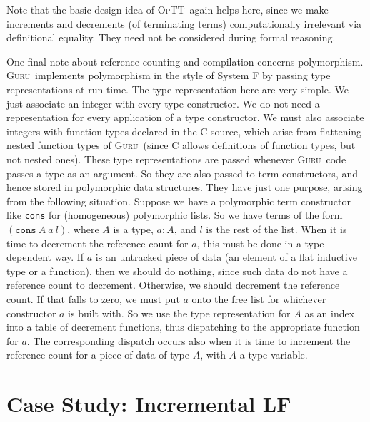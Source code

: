 \documentclass[9pt,natbib]{sigplanconf}
\newcommand{\optt}{\textsc{OpTT}}
\newcommand{\guru}[0]{\textsc{Guru}}
\begin{document}
Note that the basic design idea of \optt\ again helps here, since we
make increments and decrements (of terminating terms) computationally
irrelevant via definitional equality.  They need not be considered
during formal reasoning.

One final note about reference counting and compilation concerns
polymorphism.  \guru\ implements polymorphism in the style of System F
by passing type representations at run-time.  The type representation
here are very simple.  We just associate an integer with every type
constructor.  We do not need a representation for every application of
a type constructor.  We must also associate integers with function
types declared in the C source, which arise from flattening nested
function types of \guru\ (since C allows definitions of function
types, but not nested ones).  These type representations are passed
whenever \guru\ code passes a type as an argument.  So they are also
passed to term constructors, and hence stored in polymorphic data
structures.  They have just one purpose, arising from the following
situation.  Suppose we have a polymorphic term constructor like
\texttt{cons} for (homogeneous) polymorphic lists.  So we have terms
of the form $(\texttt{cons}\ A\ a\ l)$, where $A$ is a type, $a:A$,
and $l$ is the rest of the list.  When it is time to decrement the
reference count for $a$, this must be done in a type-dependent way.
If $a$ is an untracked piece of data (an element of a flat inductive
type or a function), then we should do nothing, since such data do not
have a reference count to decrement.  Otherwise, we should decrement
the reference count.  If that falls to zero, we must put $a$ onto the
free list for whichever constructor $a$ is built with.  So we use the
type representation for $A$ as an index into a table of decrement
functions, thus dispatching to the appropriate function for $a$.  The
corresponding dispatch occurs also when it is time to increment the
reference count for a piece of data of type $A$, with $A$ a type
variable.

\section{Case Study: Incremental LF}
\label{sec:golfsock}
\end{document}

